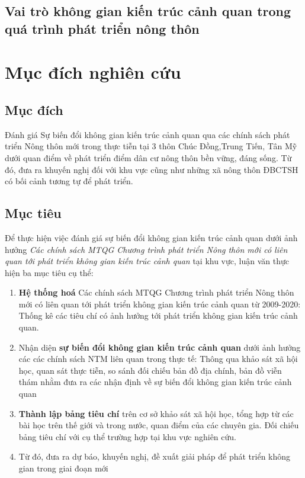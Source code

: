 \documentclass[../thesis.tex]{subfiles}
\begin{document}
\subsection{Vai trò không gian kiến trúc cảnh quan trong quá trình phát triển nông thôn
}
\section{Mục đích nghiên cứu}
\subsection{Mục đích}
Đánh giá Sự biến đổi không gian kiến trúc cảnh quan qua các chính sách phát triển Nông thôn mới trong thực tiễn tại 3 thôn Chúc Đồng,Trung Tiến, Tân Mỹ dưới quan điểm về phát triển điểm dân cư nông thôn bền vững, đáng sống. Từ đó, đưa ra  khuyến nghị đối với khu vực cũng như những xã nông thôn ĐBCTSH có bối cảnh tương tự để phát triển.
\subsection{Mục tiêu}
Để thực hiện việc đánh giá sự biến đổi không gian kiến trúc cảnh quan dưới ảnh hưởng \textit{Các chính sách MTQG Chương trình phát triển Nông thôn mới có liên quan tới phát triển không gian kiến trúc cảnh quan} tại khu vực, luận văn thực hiện ba mục tiêu cụ thể:
\begin{enumerate}
	\item \textbf \textbf{Hệ thống hoá} Các chính sách MTQG Chương trình phát triển Nông thôn mới có liên quan tới phát triển không gian kiến trúc cảnh quan từ 2009-2020: Thống kê các tiêu chí có ảnh hưởng tới phát triển không gian kiến trúc cảnh quan.
	\item Nhận diện \textbf{sự biến đổi không gian kiến trúc cảnh quan} dưới ảnh hưởng các các chính sách NTM liên quan trong thực tế: Thông qua khảo sát xã hội học, quan sát thực tiễn, so sánh đối chiếu bản đồ địa chính, bản đồ viễn thám nhằm đưa ra các nhận định về sự biến đổi không gian kiến trúc cảnh quan
	\item \textbf{Thành lập bảng tiêu chí} trên cơ sở khảo sát xã hội học, tổng hợp từ các bài học trên thế giới và trong nước, quan điểm của các chuyên gia. Đối chiếu bảng tiêu chí với cụ thể trường hợp tại khu vực nghiên cứu.
	\item Từ đó, đưa ra dự báo, khuyến nghị, đề xuất giải pháp để phát triển không gian trong giai đoạn mới
\end{enumerate}
\end{document}

